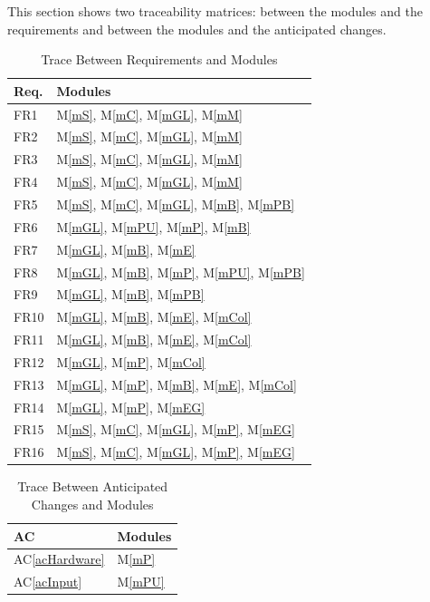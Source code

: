 \documentclass[12pt, titlepage]{article}
\newcommand{\acref}[1]{AC\ref{#1}}
\newcommand{\mref}[1]{M\ref{#1}}
\begin{document}
This section shows two traceability matrices: between the modules and the
requirements and between the modules and the anticipated changes.

\begin{table}[H]
\centering
\begin{tabular}{p{} p{}}
\toprule
\textbf{Req.} & \textbf{Modules}\\
\midrule
FR1 & \mref{mS}, \mref{mC}, \mref{mGL}, \mref{mM}\\
FR2 & \mref{mS}, \mref{mC}, \mref{mGL}, \mref{mM}\\
FR3 & \mref{mS}, \mref{mC}, \mref{mGL}, \mref{mM}\\
FR4 & \mref{mS}, \mref{mC}, \mref{mGL}, \mref{mM}\\
FR5 & \mref{mS}, \mref{mC}, \mref{mGL}, \mref{mB}, \mref{mPB}\\
FR6 & \mref{mGL}, \mref{mPU}, \mref{mP}, \mref{mB}\\
FR7 & \mref{mGL}, \mref{mB}, \mref{mE}\\
FR8 & \mref{mGL}, \mref{mB}, \mref{mP}, \mref{mPU}, \mref{mPB}\\
FR9 & \mref{mGL}, \mref{mB}, \mref{mPB}\\
FR10 & \mref{mGL}, \mref{mB}, \mref{mE}, \mref{mCol}\\
FR11 & \mref{mGL}, \mref{mB}, \mref{mE}, \mref{mCol}\\
FR12 & \mref{mGL}, \mref{mP}, \mref{mCol}\\
FR13 & \mref{mGL}, \mref{mP}, \mref{mB}, \mref{mE}, \mref{mCol}\\
FR14 & \mref{mGL}, \mref{mP}, \mref{mEG}\\
FR15 & \mref{mS}, \mref{mC}, \mref{mGL}, \mref{mP}, \mref{mEG}\\
FR16 & \mref{mS}, \mref{mC}, \mref{mGL}, \mref{mP}, \mref{mEG}\\
\bottomrule
\end{tabular}
\caption{Trace Between Requirements and Modules}
\label{TblRT}
\end{table}

\begin{table}[H]
\centering
\begin{tabular}{p{} p{}}
\toprule
\textbf{AC} & \textbf{Modules}\\
\midrule
\acref{acHardware} & \mref{mP}\\
\acref{acInput} & \mref{mPU}\\
\bottomrule
\end{tabular}
\caption{Trace Between Anticipated Changes and Modules}
\label{TblACT}
\end{table}
\end{document}
